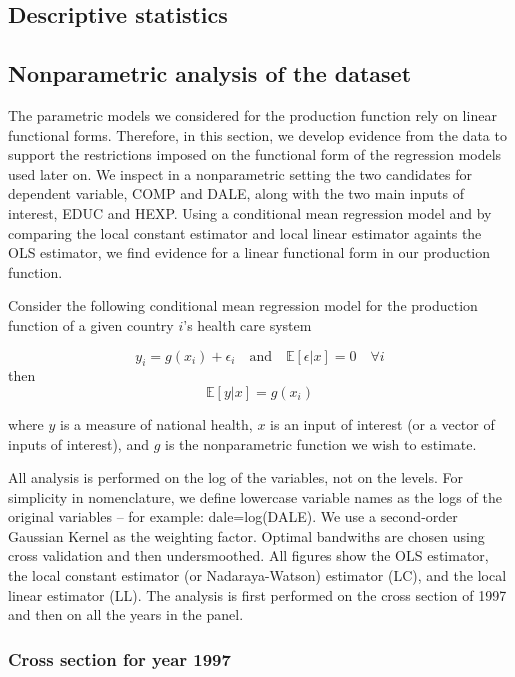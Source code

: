 \documentclass[12pt,a4paper]{article}\usepackage[]{graphicx}\usepackage[]{color}
\begin{document}
\subsection{Descriptive statistics}


\subsection{Nonparametric analysis of the dataset}
The parametric models we considered for the production function rely on linear functional forms. Therefore, in this section, we develop evidence from the data to support the restrictions imposed on the functional form of the regression models used later on. We inspect in a nonparametric setting the two candidates for dependent variable, COMP and DALE, along with the two main inputs of interest, EDUC and HEXP. Using a conditional mean regression model and by comparing the local constant estimator and local linear estimator againts the OLS estimator, we find evidence for a linear functional form in our production function. 

Consider the following conditional mean regression model for the production function of a given country $i$'s health care system

$$
y_i = g(x_i) + \epsilon_i \quad \textrm{and} \quad \mathbb{E}[\epsilon|x]=0 \quad \forall i
$$
then
$$
\mathbb{E}[y|x]=g(x_i)
$$

where $y$ is a measure of national health, $x$ is an input of interest (or a vector of inputs of interest), and $g$ is the nonparametric function we wish to estimate.

All analysis is performed on the log of the variables, not on the levels. For simplicity in nomenclature, we define lowercase variable names as the logs of the original variables -- for example: dale=log(DALE). We use a second-order Gaussian Kernel as the weighting factor. Optimal bandwiths are chosen using cross validation and then undersmoothed. All figures show the OLS estimator, the local constant estimator (or Nadaraya-Watson) estimator (LC), and the local linear estimator (LL). The analysis is first performed on the cross section of 1997 and then on all the years in the panel.





\subsubsection{Cross section for year 1997}
\end{document}
